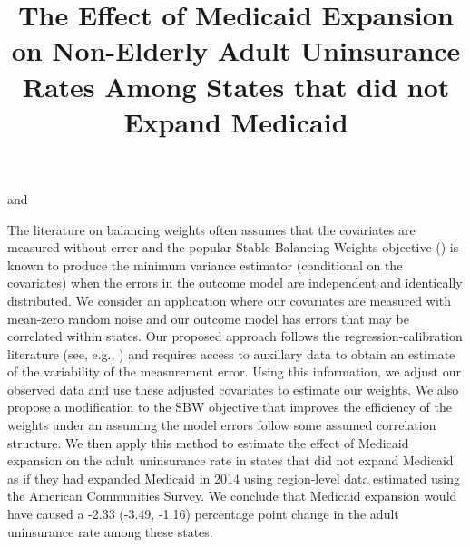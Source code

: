 \documentclass[aoas]{imsart}
\theoremstyle{plain}
\theoremstyle{remark}
\begin{document}
\begin{frontmatter}
\title{The Effect of Medicaid Expansion on Non-Elderly Adult Uninsurance Rates Among States that did not Expand Medicaid}

\begin{aug}
\author[A]{ } and
\author[A]{ }
\address[A]{Carnegie Mellon University, Heinz College and Department of Statistics and Data Science }

\end{aug}

\begin{flushleft}
The literature on balancing weights often assumes that the covariates are measured without error and the popular Stable Balancing Weights objective (\cite{zubizarreta2015stable}) is known to produce the minimum variance estimator (conditional on the covariates) when the errors in the outcome model are independent and identically distributed. We consider an application where our covariates are measured with mean-zero random noise and our outcome model has errors that may be correlated within states. Our proposed approach follows the regression-calibration literature (see, e.g., \cite{gleser1992importance}) and requires access to auxillary data to obtain an estimate of the variability of the measurement error. Using this information, we adjust our observed data and use these adjusted covariates to estimate our weights. We also propose a modification to the SBW objective that improves the efficiency of the weights under an assuming the model errors follow some assumed correlation structure. We then apply this method to estimate the effect of Medicaid expansion on the adult uninsurance rate in states that did not expand Medicaid as if they had expanded Medicaid in 2014 using region-level data estimated using the American Communities Survey. We conclude that Medicaid expansion would have caused a -2.33 (-3.49, -1.16) percentage point change in the adult uninsurance rate among these states. 
\end{flushleft}



\end{frontmatter}
\end{document}
